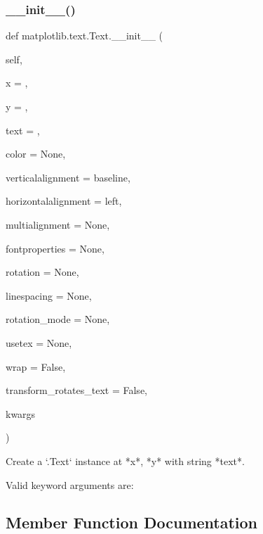 \subsubsection{\texorpdfstring{\+\_\+\+\_\+init\+\_\+\+\_\+()}{\_\_init\_\_()}}
{\footnotesize\ttfamily def matplotlib.\+text.\+Text.\+\_\+\+\_\+init\+\_\+\+\_\+ (\begin{DoxyParamCaption}\item[{}]{self,  }\item[{}]{x = {},  }\item[{}]{y = {},  }\item[{}]{text = {\ttfamily \textquotesingle{}\textquotesingle{}},  }\item[{}]{color = {\ttfamily None},  }\item[{}]{verticalalignment = {\ttfamily \textquotesingle{}baseline\textquotesingle{}},  }\item[{}]{horizontalalignment = {\ttfamily \textquotesingle{}left\textquotesingle{}},  }\item[{}]{multialignment = {\ttfamily None},  }\item[{}]{fontproperties = {\ttfamily None},  }\item[{}]{rotation = {\ttfamily None},  }\item[{}]{linespacing = {\ttfamily None},  }\item[{}]{rotation\+\_\+mode = {\ttfamily None},  }\item[{}]{usetex = {\ttfamily None},  }\item[{}]{wrap = {\ttfamily False},  }\item[{}]{transform\+\_\+rotates\+\_\+text = {\ttfamily False},  }\item[{}]{kwargs }\end{DoxyParamCaption})}

\begin{DoxyVerb}Create a `.Text` instance at *x*, *y* with string *text*.

Valid keyword arguments are:

\end{DoxyVerb}
 

\subsection{Member Function Documentation}
\mbox{\label{classmatplotlib_1_1text_1_1Text_a32d4ae9308c5b63422c8b57d52d076f9}} 

